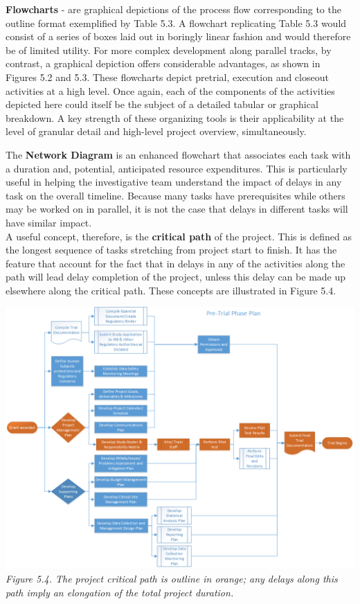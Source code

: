 \documentclass[]{book}
\theoremstyle{definition}
\theoremstyle{definition}
\theoremstyle{definition}
\theoremstyle{remark}
\begin{document}
\textbf{Flowcharts} - are graphical depictions of the process flow
corresponding to the outline format exemplified by Table 5.3. A
flowchart replicating Table 5.3 would consist of a series of boxes laid
out in boringly linear fashion and would therefore be of limited
utility. For more complex development along parallel tracks, by
contrast, a graphical depiction offers considerable advantages, as shown
in Figures 5.2 and 5.3. These flowcharts depict pretrial, execution and
closeout activities at a high level. Once again, each of the components
of the activities depicted here could itself be the subject of a
detailed tabular or graphical breakdown. A key strength of these
organizing tools is their applicability at the level of granular detail
and high-level project overview, simultaneously.

The \textbf{Network Diagram} is an enhanced flowchart that associates
each task with a duration and, potential, anticipated resource
expenditures. This is particularly useful in helping the investigative
team understand the impact of delays in any task on the overall
timeline. Because many tasks have prerequisites while others may be
worked on in parallel, it is not the case that delays in different tasks
will have similar impact.\\
A useful concept, therefore, is the \textbf{critical path} of the
project. This is defined as the longest sequence of tasks stretching
from project start to finish. It has the feature that account for the
fact that in delays in any of the activities along the path will lead
delay completion of the project, unless this delay can be made up
elsewhere along the critical path. These concepts are illustrated in
Figure 5.4.

\includegraphics{images/book/pm4.png} \emph{Figure 5.4. The project
critical path is outline in orange; any delays along this path imply an
elongation of the total project duration. }
\end{document}
